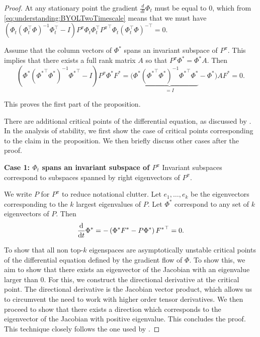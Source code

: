 \begin{proof}
    At any stationary point the gradient $\frac{d}{dt}\Phi_t$ must be equal to $0$, which from \cref{eq:understanding:BYOLTwoTimescale} means that we must have $\left(\Phi_t\left(\Phi^\top_t \Phi\right)^{-1}\Phi_t^\top - I\right)P^\pi\Phi_t \Phi_t^\top {P^\pi}^\top \Phi_t\left(\Phi^\top_t \Phi\right)^{-\top}=0$.

    Assume that the column vectors of $\Phi^*$ spans an invariant subspace of $P^\pi$. This implies that there exists a full rank matrix $A$ so that $P^\pi \Phi^* = \Phi^*A$.
    Then 
    $$\left(\Phi^*\left({\Phi^*}^\top \Phi^*\right)^{-1}{\Phi^*}^\top - I\right)P^\pi\Phi^* F^*=\Big(\Phi^*\underbrace{\left({\Phi^*}^\top \Phi^*\right)^{-1}{\Phi^*}^\top\Phi^*}_{=I} - \Phi^*\Big)A F^*=0.$$

This proves the first part of the proposition.

There are additional critical points of the differential equation, as discussed by \cite{tang2022understanding}.
In the analysis of stability, we first show the case of critical points corresponding to the claim in the proposition.
We then briefly discuss other cases after the proof.

\textbf{Case 1: $\Phi_t$ spans an invariant subspace of $P^\pi$}
Invariant subspaces correspond to subspaces spanned by right eigenvectors of $P^\pi$.

We write $P$ for $P^\pi$ to reduce notational clutter.
Let $e_1,\dots,e_k$ be the eigenvectors corresponding to the $k$ largest eigenvalues of $P$.
Let $\Phi^*$ correspond to any set of $k$ eigenvectors of $P$. Then
\begin{align*}
    \frac{\mathrm{d}}{\mathrm{d} t}\Phi^* = -\left(\Phi^* F^* - P \Phi^*\right) {F^*}^\top = 0.
\end{align*}

To show that all non top-$k$ eigenspaces are asymptotically unstable critical points of the differential equation defined by the gradient flow of $\Phi$.
To show this, we aim to show that there exists an eigenvector of the Jacobian with an eigenvalue larger than $0$.
For this, we construct the directional derivative at the critical point.
The directional derivative is the Jacobian vector product, which allows us to circumvent the need to work with higher order tensor derivatives.
We then proceed to show that there exists a direction which corresponds to the eigenvector of the Jacobian with positive eigenvalue.
This concludes the proof.
This technique closely follows the one used by \cite{lelan2023bootstrapped}.


\end{proof}
